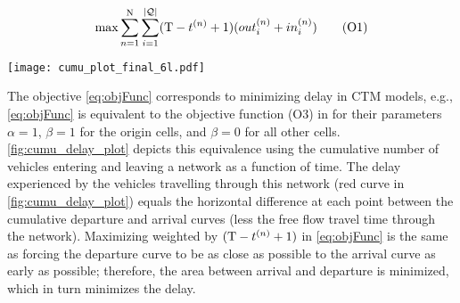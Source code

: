 \begin{equation}
\max 
 \sum_{n=1}^{\mathrm{N}} \sum_{i=1}^{|\mathcal{\mathcal{Q}}|} (\mathrm{T} - t^{(n)} + 1) (out_{i}^{(n)} + in_{i}^{(n)})
\tag{O1}\label{eq:objFunc}
\end{equation}


\begin{figure*}[t!]
\centering
\texttt{[image: cumu\_plot\_final\_6l.pdf]}
\caption[]{Cumulative arrival (blue) and departure (green) curves, and the
 delay curve (red) . The  departure curve is maximized by the objective
function \eqref{eq:objFunc}, which has the same effect as minimizing the area
under the delay curve.}
\label{fig:cumu_delay_plot}
\end{figure*}


The objective \eqref{eq:objFunc} corresponds to minimizing delay in CTM models,
e.g., \eqref{eq:objFunc} is equivalent to the objective function (O3) in
 for their parameters $\alpha = 1$, $\beta = 1$ for the origin cells, and
$\beta = 0$ for all other cells.
%
\cref{fig:cumu_delay_plot} depicts this equivalence using the cumulative number
of vehicles entering and leaving a network as a function of time.
%
The delay experienced by the vehicles travelling through this network (red curve
in \cref{fig:cumu_delay_plot}) equals the horizontal difference at each point
between the cumulative departure and arrival curves (less the free flow travel
time through the network).
%
Maximizing  weighted by $(\mathrm{T} - t^{(n)} +1)$ in \eqref{eq:objFunc} is the
same as forcing the departure curve to be as close as possible to the arrival
curve as early as possible; therefore, the area between arrival and departure is
minimized, which in turn minimizes the delay.







